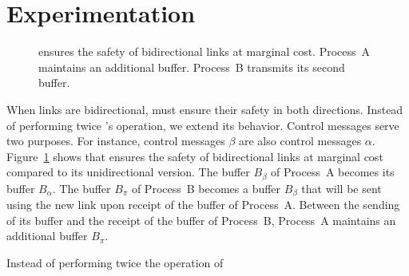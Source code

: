 
\section{Experimentation}
\label{sec:experimentation}

\begin{figure}
  \begin{center}
  
  \caption{\label{fig:bibroadcast}\RPCBROADCAST ensures the safety of bidirectional links
    at marginal cost. Process~A maintains an additional buffer. Process~B transmits its
    second buffer.}
  \end{center}
\end{figure}

When links are bidirectional, \RPCBROADCAST must ensure their safety in both
directions. Instead of performing twice \RPCBROADCAST's operation, we extend its
behavior. Control messages serve two purposes. For instance, control messages
$\beta$ are also control messages $\alpha$.  Figure~\ref{fig:bibroadcast} shows
that \RPCBROADCAST ensures the safety of bidirectional links at marginal cost
compared to its unidirectional version. The buffer $B_\beta$ of Process~A
becomes its buffer $B_\alpha$. The buffer $B_\pi$ of Process~B becomes a buffer
$B_\beta$ that will be sent using the new link upon receipt of the buffer of
Process~A. Between the sending of its buffer and the receipt of the buffer of
Process~B, Process~A maintains an additional buffer $B_\pi$.

Instead of performing twice the operation of \RPCBROADCAST

